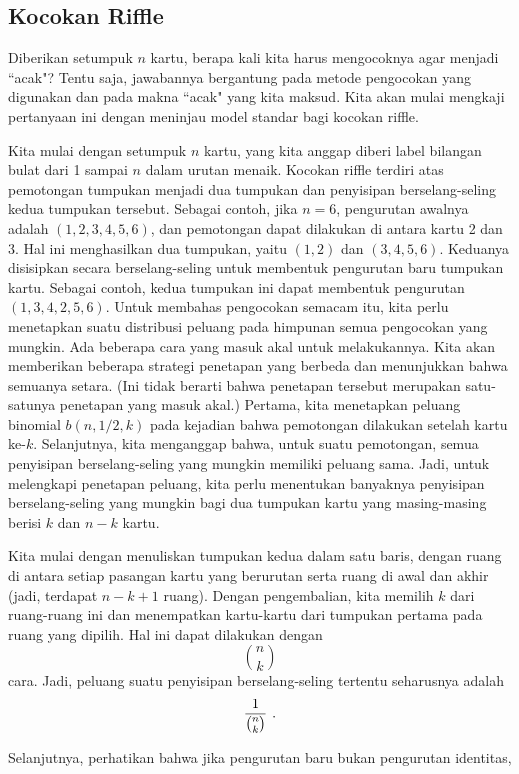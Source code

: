 \subsection*{Kocokan Riffle}
Diberikan setumpuk $n$ kartu, berapa kali kita harus mengocoknya agar menjadi ``acak"?
Tentu saja, jawabannya bergantung pada metode pengocokan yang digunakan dan pada makna
``acak" yang kita maksud.  Kita akan mulai mengkaji pertanyaan ini dengan meninjau model
standar bagi kocokan riffle.
\par Kita mulai dengan setumpuk $n$ kartu, yang kita anggap diberi label bilangan bulat
dari 1 sampai $n$ dalam urutan menaik.  Kocokan riffle terdiri atas pemotongan
tumpukan menjadi dua tumpukan dan penyisipan berselang-seling
kedua tumpukan tersebut.  Sebagai contoh, jika $n = 6$, pengurutan awalnya adalah
$(1, 2, 3, 4, 5, 6)$, dan pemotongan dapat dilakukan di antara kartu 2 dan 3.  Hal ini
menghasilkan dua tumpukan, yaitu $(1, 2)$ dan $(3, 4, 5, 6)$.  Keduanya disisipkan secara
berselang-seling untuk membentuk pengurutan baru tumpukan kartu.  Sebagai contoh, kedua
tumpukan ini dapat membentuk pengurutan $(1, 3, 4, 2, 5, 6)$.  Untuk membahas pengocokan
semacam itu, kita perlu menetapkan suatu distribusi peluang pada himpunan semua pengocokan
yang mungkin.  Ada beberapa cara yang masuk akal untuk melakukannya.  Kita akan memberikan
beberapa strategi penetapan yang berbeda dan menunjukkan bahwa semuanya setara.  (Ini tidak
berarti bahwa penetapan tersebut merupakan satu-satunya penetapan yang masuk akal.)
Pertama, kita menetapkan peluang binomial $b(n, 1/2, k)$ pada kejadian bahwa pemotongan
dilakukan setelah kartu ke-$k$.  Selanjutnya, kita menganggap bahwa, untuk suatu
pemotongan, semua penyisipan berselang-seling yang mungkin memiliki peluang sama.  Jadi,
untuk melengkapi penetapan peluang, kita perlu menentukan banyaknya penyisipan
berselang-seling yang mungkin bagi dua tumpukan kartu yang masing-masing berisi $k$ dan
$n-k$ kartu.
\par Kita mulai dengan menuliskan tumpukan kedua dalam satu baris, dengan ruang di antara
setiap pasangan kartu yang berurutan serta ruang di awal dan akhir (jadi, terdapat
$n-k+1$ ruang).  Dengan pengembalian, kita memilih $k$ dari ruang-ruang ini dan
menempatkan kartu-kartu dari tumpukan pertama pada ruang yang dipilih.  Hal ini dapat
dilakukan dengan
$${{n}\choose{k}}$$ cara.  Jadi, peluang suatu penyisipan berselang-seling tertentu
seharusnya adalah
$${1\over{{n}\choose{k}}}\ .$$
\par Selanjutnya, perhatikan bahwa jika pengurutan baru bukan pengurutan identitas,

